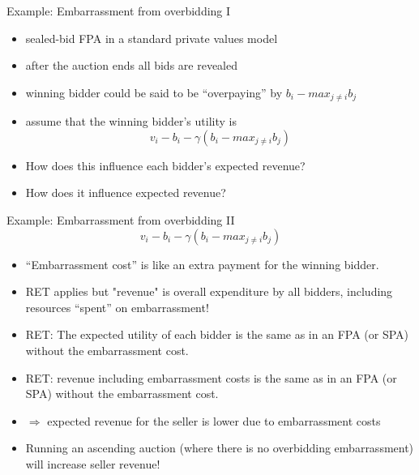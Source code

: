\documentclass[bigger]{beamer}
\newcommand{\Ra}{\Rightarrow} \newcommand{\ra}{\rightarrow} \newcommand{\Lra}{\Leftrightarrow}
\begin{document}
\begin{frame}[label={sec:org8349f65}]{Example: Embarrassment from overbidding I}
\begin{itemize}
\item sealed-bid FPA in a standard private values model
\item after the auction ends all bids are revealed
\item winning bidder could be said to be “overpaying” by \(b_i -max_{j\neq i} b_ j\)
\item assume that the winning bidder’s utility is
$$v_i - b_i -\gamma (b_ i - max_{j\neq i} b_ j)$$
\item How does this inﬂuence each bidder’s expected revenue?
\item How does it inﬂuence expected revenue?
\end{itemize}
\end{frame}
\begin{frame}[label={sec:org88fb033}]{Example: Embarrassment from overbidding II}
$$v_i - b_i -\gamma (b_ i - max_{j\neq i} b_ j)$$
\begin{itemize}
\item “Embarrassment cost” is like an extra payment for the winning bidder.
\item RET applies but "revenue" is overall expenditure by all bidders, including resources “spent” on embarrassment!
\item RET: The expected utility of each bidder is the same as in an FPA (or SPA) without the embarrassment cost.
\item RET: revenue including embarrassment costs is the same as in an FPA (or SPA) without the embarrassment cost.
\item \(\Ra\) expected revenue for the seller is lower due to embarrassment costs
\item Running an ascending auction (where there is no overbidding embarrassment) will increase seller revenue!
\end{itemize}
\end{frame}
\end{document}
